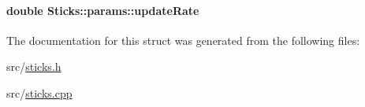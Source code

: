 \hypertarget{structSticks_1_1params_a2b70eb4c47c0e08cd08c82c0166bdf72}{
\paragraph[{update\-Rate}]{\setlength{\rightskip}{0pt plus 5cm}double {\bf \-Sticks\-::params\-::update\-Rate}}}\label{structSticks_1_1params_a2b70eb4c47c0e08cd08c82c0166bdf72}


\-The documentation for this struct was generated from the following files\-:\begin{DoxyCompactItemize}
\item 
src/\hyperlink{sticks_8h}{sticks.\-h}\item 
src/\hyperlink{sticks_8cpp}{sticks.\-cpp}\end{DoxyCompactItemize}

